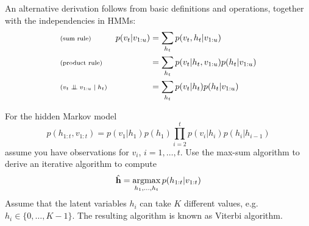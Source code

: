 \begin{exenumerate}
\begin{solution}
    An alternative derivation follows from basic definitions and
    operations, together with the independencies in HMMs:
    \begin{align}
    &\text{\scriptsize (sum rule)}&  p(v_t | v_{1:u}) &= \sum_{h_t} p(v_t, h_t|v_{1:u})\\
    &\text{\scriptsize (product rule)}&  & = \sum_{h_t} p(v_t|h_t, v_{1:u}) p(h_t|v_{1:u})\\
    &\text{\scriptsize ($v_t \mathrel{\perp\mspace{-10mu}\perp} v_{1:u} \mid h_t$)}&  & = \sum_{h_t} p(v_t|h_t) p(h_t|v_{1:u})
    \end{align}
  \end{solution}
  
\end{exenumerate}


For the hidden Markov model
$$ p(h_{1:t},v_{1:t}) = p(v_1|h_1)p(h_1)\prod_{i=2}^t
p(v_i|h_i)p(h_i|h_{i-1})$$ assume you have observations for $v_i$,
$i=1, \ldots, t$. Use the max-sum algorithm to derive an iterative algorithm to compute
\begin{equation}
  \hat{\mathbf{h}} = \operatorname*{\mathrm{argmax}}_{h_1, \ldots, h_t}  p(h_{1:t}|v_{1:t})
\end{equation}
Assume that the latent variables $h_i$ can take $K$ different values,
e.g.\ $h_i \in \{0,\ldots, K-1\}$. The resulting algorithm is known as
Viterbi algorithm.

